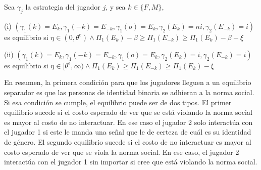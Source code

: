 \begin{figure}[!ht]
\begin{minipage}{\textwidth}
\end{minipage}
\begin{singlespace}
\end{singlespace}
\end{figure}
\vspace*{0.5cm}
\vfill
\begin{framed}
\noindent Sea $\gamma_j$ la estrategia del jugador $j$, y  sea $k \in \{F,M\}$,

\noindent (i) $(\gamma_1(k)=E_k, \gamma_1(-k)=E_{-k}, \gamma_1(o)=E_k, \gamma_2(E_k)=ni, \gamma_2(E_{-k})=i)$ es equilibrio si $\eta\in(0, \theta^e) \wedge \Pi_1(E_{k})- \beta \geq \Pi_1(E_{-k}) \geq  \Pi_1(E_{k})- \beta - \xi$

\noindent (ii) $(\gamma_1(k)=E_k, \gamma_1(-k)=E_{-k}, \gamma_1(o)=E_k, \gamma_2(E_k)=i, \gamma_2(E_{-k})=i)$ es equilibrio si $\eta\in[\theta^e, \infty) \wedge \Pi_1(E_{k}) \geq \Pi_1(E_{-k}) \geq \Pi_1(E_{k})- \xi$
\end{framed}

En resumen, la primera condición para que los jugadores lleguen a un equilibrio separador es que las personas de identidad binaria se adhieran a la norma social. Si esa condición se cumple, el equilibrio puede ser de dos tipos. El primer equilibrio sucede si el costo esperado de ver que se está violando la norma social es mayor al costo de no interactuar. En ese caso el jugador 2 solo interactúa con el jugador 1 si este le manda una señal que le de certeza de cuál es su identidad de género. El segundo equilibrio sucede si el costo de no interactuar es mayor al costo esperado de ver que se viola la norma social. En ese caso, el jugador 2 interactúa con el jugador 1 sin importar si cree que está violando la norma social. 

